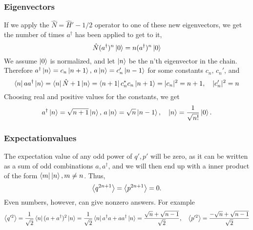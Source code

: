 \subsubsection*{Eigenvectors}
If we apply the $\hat N = \hat H' - 1/2$ operator to one of these new eigenvectors, we get the number of times $a^\dagger$ has been applied to get to it, 
\begin{equation*}
    \hat N (a^\dagger )^{n} \ket 0 = n (a^\dagger )^{n} \ket 0 
\end{equation*}
We assume $\ket 0$ is normalized, and  let $\ket{n}$ be the n'th eigenvector in the chain. Therefore $a^\dagger \ket{n} = c_n \ket{n+1} ,\, a\ket{n} = c'_n \ket{n-1}$ for some constants $c_n, \, c_n'$, and 
\begin{equation*}
    \bra{n}aa^\dagger\ket{n} = \bra{n}\hat N + 1\ket{n} =  \bra{n+1}c_n^*c_n\ket{n+1} = |c_n|^2 = n + 1, \quad |c_n'|^2=n  
\end{equation*}
Choosing real and positive values for the constants, we get
\begin{equation}
    \label{eigenvectors harmonic oscillator}
    a^\dagger \ket n = \sqrt{n + 1} \ket{n}, \, a \ket n = \sqrt{n} \ket{n-1}, \quad \ket n = \frac{1}{\sqrt{n!}} \ket 0.
\end{equation}

\subsubsection*{Expectationvalues}
The expectation value of any odd power of $q', p'$ will be zero, as it can be written as a sum of odd combinations $a, a^\dagger$, and we will then end up with a inner product of the form $\bra{m}\ket{n}, m \neq n$. Thus,
\begin{equation}
    \label{even escpectationvalues harmonic oscillator}
    \left \langle q^{2n+1} \right \rangle = \left \langle p^{2n+1} \right \rangle = 0.
\end{equation}
Even numbers, however, can give nonzero answers. For example
\begin{equation}
    \label{squared expectation values harmonic oscillator}
    \left \langle q'^2 \right \rangle = \frac{1}{\sqrt 2}\bra{n}(a + a^\dagger)^2\ket{n} = \frac{1}{\sqrt 2}\bra{n}a^\dagger a + a a^\dagger \ket{n} = \frac{\sqrt n + \sqrt{n - 1}}{\sqrt 2}, \quad \left \langle p'^2 \right \rangle = \frac{ - \sqrt n + \sqrt{n - 1}}{\sqrt 2}
\end{equation}


